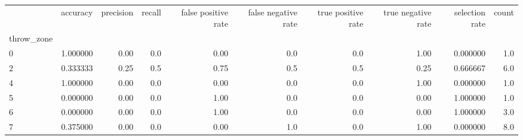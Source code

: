 \begin{tabular}{lrrrrrrrrr}
\toprule
{} &  accuracy &  precision &  recall &  false positive rate &  false negative rate &  true positive rate &  true negative rate &  selection rate &  count \\
throw\_zone &           &            &         &                      &                      &                     &                     &                 &        \\
\midrule
0          &  1.000000 &       0.00 &     0.0 &                 0.00 &                  0.0 &                 0.0 &                1.00 &        0.000000 &    1.0 \\
2          &  0.333333 &       0.25 &     0.5 &                 0.75 &                  0.5 &                 0.5 &                0.25 &        0.666667 &    6.0 \\
4          &  1.000000 &       0.00 &     0.0 &                 0.00 &                  0.0 &                 0.0 &                1.00 &        0.000000 &    1.0 \\
5          &  0.000000 &       0.00 &     0.0 &                 1.00 &                  0.0 &                 0.0 &                0.00 &        1.000000 &    1.0 \\
6          &  0.000000 &       0.00 &     0.0 &                 1.00 &                  0.0 &                 0.0 &                0.00 &        1.000000 &    3.0 \\
7          &  0.375000 &       0.00 &     0.0 &                 0.00 &                  1.0 &                 0.0 &                1.00 &        0.000000 &    8.0 \\
\bottomrule
\end{tabular}

